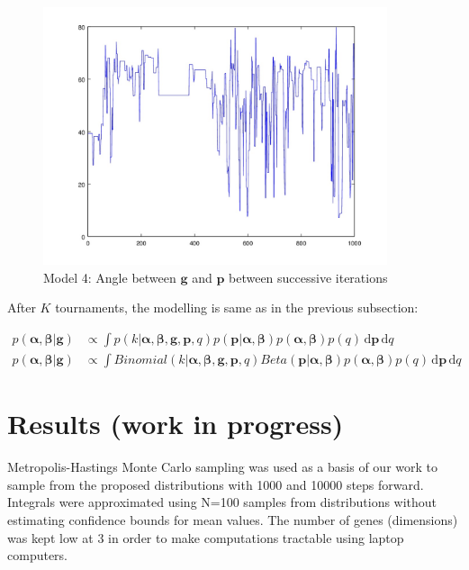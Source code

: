 \documentclass{article}
\begin{document}
\begin{figure}

\centering
\includegraphics[keepaspectratio,width=0.9\textwidth]{method4.jpg}

\caption{Model 4: Angle between $\bm{g}$ and $\bm{p}$ between successive iterations}

\label{fig:method4}

\end{figure}

After $K$ tournaments, the modelling is same as in the previous subsection:

\begin{equation}
\begin{aligned}
p(\bm{\alpha},\bm{\beta}|\mathbf{g}) &\propto \int p(k|\bm{\alpha},\bm{\beta},\mathbf{g},\mathbf{p},q) p(\mathbf{p}|\bm{\alpha},\bm{\beta}) p(\bm{\alpha},\bm{\beta})p(q) \, \mathrm{d}\mathbf{p} \,  \mathrm{d}q \\
p(\bm{\alpha},\bm{\beta}|\mathbf{g}) &\propto \int Binomial(k|\bm{\alpha},\bm{\beta},\mathbf{g},\mathbf{p},q) Beta(\mathbf{p}|\bm{\alpha},\bm{\beta}) p(\bm{\alpha},\bm{\beta})p(q) \, \mathrm{d}\mathbf{p} \,  \mathrm{d}q
\end{aligned}
\end{equation}


\section{Results (work in progress)}
\label{results}

Metropolis-Hastings Monte Carlo sampling was used as a basis of our work to sample from the proposed distributions with 1000 and 10000 steps forward. Integrals were approximated using N=100 samples from distributions without estimating confidence bounds for mean values. The number of genes (dimensions) was kept low at 3 in order to make computations tractable using laptop computers.
\end{document}
